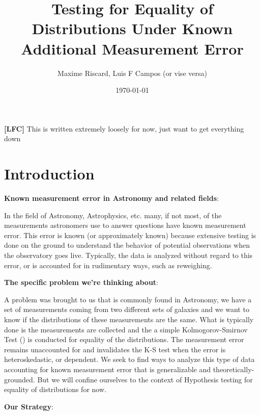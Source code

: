 \documentclass[12pt]{article}
\title{Testing for Equality of Distributions Under Known Additional Measurement Error}
\author{Maxime Riscard, Luis F Campos (or vise versa)}
\date{\today}
\newcommand{\lfc}[1]{\textcolor{Lblue}{{\bf[LFC]} #1}}
\begin{document}
\maketitle

\lfc{This is written extremely loosely for now, just want to get everything down}

\section{Introduction} %
\label{sec:introduction}


{\bf{Known measurement error in Astronomy and related fields}}:

In the field of Astronomy, Astrophysics, etc. many, if not most, of the measurements astronomers use to answer questions have known measurement error. This error is known (or approximately known) because extensive testing is done on the ground to understand the behavior of potential observations when the observatory goes live. Typically, the data is analyzed without regard to this error, or is accounted for in rudimentary ways, such as reweighing. 


{\bf{The specific problem we're thinking about}}:

A problem was brought to us that is commonly found in Astronomy, we have a set of measurements coming from two different sets of galaxies and we want to know if the distributions of these measurements are the same. What is typically done is the measurements are collected and the a simple Kolmogorov-Smirnov Test (\cite{smirnov1948}) is conducted for equality of the distributions. The measurement error remains unaccounted for and invalidates the K-S test when the error is heteroskedastic, or dependent. We seek to find ways to analyze this type of data accounting for known measurement error that is generalizable and theoretically-grounded. But we will confine ourselves to the context of Hypothesis testing for equality of distributions for now.


{\bf{Our Strategy}}:
\end{document}
